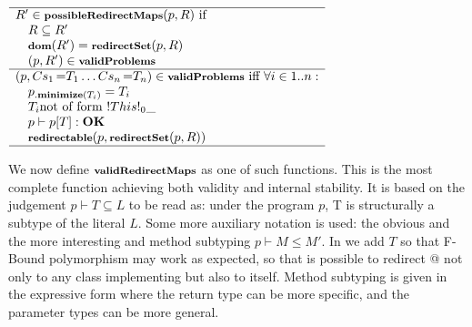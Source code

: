 \noindent$\begin{array}{l}
\hline
R' \in \fop{possibleRedirectMaps}{p, R} \text{ if }\\\quad
R \subseteq R'\\\quad
\dom{R'} = \fop{redirectSet}{p, R}\\\quad
(p, R') \in \opName{validProblems}\\
\hline
(p, Cs_1\eq{T_1}\ldots Cs_n\eq{T_n}) \in \opName{validProblems} \text{ iff }
\forall i \in 1..n:\\\quad
    p\op{minimize}{T_i}=T_i\\\quad
    T_i \text{not of form } \This0{\_}\\\quad
    p \vdash p[T] : \textbf{OK}\\\quad %
    \fop{redirectable}{p, \fop{redirectSet}{p, R}}
\\\hline
\end{array}$

We now define ${\footnotesize{\textbf{validRedirectMaps}}}$ as one of such functions.
This is the most complete function achieving both validity and
internal stability. It is based on the judgement
$p \vdash T \subseteq L$
to be read as: under the program $p$,
 T is structurally a subtype of the literal $L$.
Some more auxiliary notation is used: the obvious 
and the more interesting 
 and method subtyping
$p\vdash M \leq M'$.
In  we add $T$ so that F-Bound polymorphism may work as expected, so that is possible to redirect @
not only to any class implementing \Q@Foo@ but also to
\Q@Foo@ itself.
Method subtyping is given in the expressive form where the return type can be more specific, and the parameter types can be more general.

